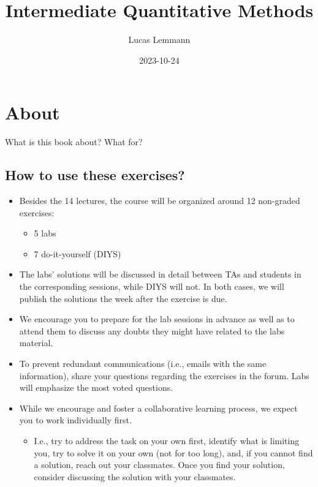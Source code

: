 \documentclass[
]{book}
\title{Intermediate Quantitative Methods}
\author{Lucas Lemmann}
\date{2023-10-24}
\providecommand{\tightlist}{%
  \setlength{\itemsep}{0pt}\setlength{\parskip}{0pt}}
\begin{document}
\maketitle

{
\setcounter{tocdepth}{1}
\tableofcontents
}
\hypertarget{about}{%
\chapter*{About}\label{about}}

What is this book about? What for?

\hypertarget{how-to-use-these-exercises}{%
\section{How to use these exercises?}\label{how-to-use-these-exercises}}

\begin{itemize}
\tightlist
\item
  Besides the 14 lectures, the course will be organized around 12 non-graded exercises:

  \begin{itemize}
  \tightlist
  \item
    5 labs
  \item
    7 do-it-yourself (DIYS)
  \end{itemize}
\item
  The labs' solutions will be discussed in detail between TAs and students in the corresponding sessions, while DIYS will not. In both cases, we will publish the solutions the week after the exercise is due.
\item
  We encourage you to prepare for the lab sessions in advance as well as to attend them to discuss any doubts they might have related to the labs material.
\item
  To prevent redundant communications (i.e., emails with the same information), share your questions regarding the exercises in the forum. Labs will emphasize the most voted questions.
\item
  While we encourage and foster a collaborative learning process, we expect you to work individually first.

  \begin{itemize}
  \tightlist
  \item
    I.e., try to address the task on your own first, identify what is limiting you, try to solve it on your own (not for too long), and, if you cannot find a solution, reach out your classmates. Once you find your solution, consider discussing the solution with your classmates.
  \end{itemize}
\end{itemize}
\end{document}
